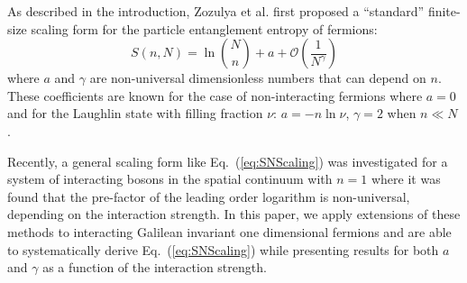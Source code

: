 As described in the introduction, Zozulya et al.  \cite{Zozulya:2008kb} first
proposed a ``standard'' finite-size scaling form for the particle entanglement
entropy of fermions:
%
\begin{equation}
    S(n,N) =  \ln \binom{N}{n} + a + \mathcal{O}\left(\frac{1}{N^\gamma}\right)
\label{eq:SNScaling}
\end{equation}
%
where $a$ and $\gamma$ are non-universal dimensionless numbers that can depend on $n$.  These
coefficients are known for the case of non-interacting fermions where $a=0$
\cite{Haque:2009df} and for the Laughlin state with filling fraction $\nu$: $a
= -n \ln \nu$, $\gamma=2$ when $n \ll N$ \cite{Zozulya:2007jw}.  

Recently, a general scaling form like Eq.~(\ref{eq:SNScaling}) was investigated
for a system of interacting bosons in the spatial continuum with $n=1$
\cite{Herdman:2015gx} where it was found that the pre-factor of the leading
order logarithm is non-universal, depending on the interaction
strength.  In this paper, we apply extensions of these methods to
interacting Galilean invariant one dimensional fermions and are able to 
systematically derive Eq.~(\ref{eq:SNScaling}) while presenting results for
both $a$ and $\gamma$ as a function of the interaction strength.


